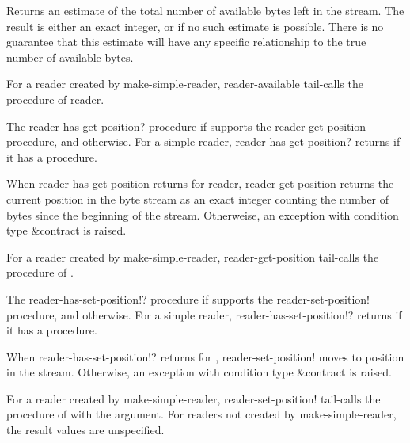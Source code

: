 \begin{entry}{%
}
   
Returns an estimate of the total number of available bytes left in the
stream. The result is either an exact integer, or \schfalse{} if no such
estimate is possible. There is no guarantee that this estimate will have
any specific relationship to the true number of available bytes.
   
For a reader created by {\cf make-simple-reader}, {\cf reader-available}
tail-calls the  procedure of reader.
\end{entry}   

\begin{entry}{%
}

The {\cf reader-has-get-position?} procedure \schtrue{} if 
supports the {\cf reader-get-position} procedure, and \schfalse{}
otherwise.  For a simple reader, {\cf reader-has-get-position?}
returns \schtrue{} if it has a  procedure.
   
When {\cf reader-has-get-position} returns \schtrue{} for reader, {\cf
  reader-get-position} returns the current position in the byte stream
as an exact integer counting the number of bytes since the beginning
of the stream.  Otherweise, an exception with condition type
{\cf\&contract} is raised.

For a reader created by {\cf make-simple-reader}, {\cf
  reader-get-position} tail-calls the  procedure of
.
\end{entry}

\begin{entry}{%
}


The {\cf reader-has-set-position!?} procedure \schtrue{} if 
supports the {\cf reader-set-position!} procedure, and \schfalse{}
otherwise.  For a simple reader, {\cf reader-has-set-position!?}
returns \schtrue{} if it has a  procedure.

When {\cf reader-has-set-position!?} returns \schtrue{} for
, {\cf reader-set-position!}  moves to position 
in the stream.  Otherwise, an {\cf exception} with condition type
{\cf\&contract} is raised.

For a reader created by {\cf make-simple-reader}, {\cf
  reader-set-position!} tail-calls the  procedure
of  with the  argument.  For readers not created
by {\cf make-simple-reader}, the result values are unspecified.
\end{entry}

